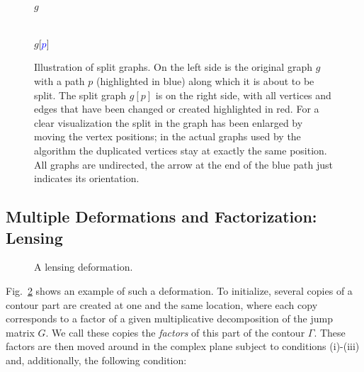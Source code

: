 \documentclass[reqno]{amsart}
\begin{document}
\begin{figure}[ht]
\begin{minipage}{0.45\textwidth}
\begin{center}
	\\
	{$g$\\}
\end{center}
\end{minipage}
\hfil
\begin{minipage}{0.45\textwidth}
\begin{center}
	\\
	{$g$[\textcolor{blue}{$p$}]\\}
\end{center}
\end{minipage}
\caption{Illustration of split graphs. On the left side is the original graph $g$ with a path $p$ (highlighted in blue)
along which it is about to be split. The split graph $g[p]$ is on the right side, with all vertices and edges that
 have been changed or created highlighted in red. For a clear visualization the split in the graph has been enlarged
 by moving the vertex positions; in the actual graphs used by the algorithm the duplicated vertices stay at exactly the same position. All graphs are undirected, the arrow at the end of the blue path just indicates its orientation.}
\label{fig:graphsplit}
\end{figure}

\subsection{Multiple Deformations and Factorization: Lensing}
\begin{figure}[ht]
	
	\caption{A lensing deformation.}
	\label{fig:lensing}
\end{figure}
Fig.~\ref{fig:lensing} shows an example of such a deformation. To initialize, several copies of a contour part are created at one and the same location, where each
copy corresponds to a factor of a given multiplicative decomposition of the jump matrix $G$. We
call these copies the \emph{factors} of this part of the contour $\Gamma$. These factors are then moved around in the complex plane 
subject to conditions (i)-(iii) and, additionally, the following condition:
\end{document}
